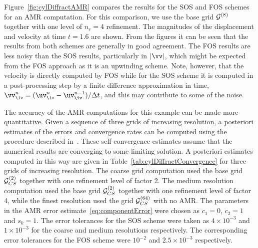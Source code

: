 
Figure~\ref{fig:cylDiffractAMR} compares the results for the SOS and FOS schemes for an AMR computation.
For this comparison, we use the base grid ${\mathcal G}^{(8)}$ together with one
level of $n_r=4$ refinement.  The magnitudes of the displacement
and velocity at time $t=1.6$ are shown. 
From the figures it can be seen that the results from both schemes are generally
in good agreement. The FOS results are less noisy than the SOS results, particularly
in $\vert \vv \vert$, 
which might be expected from the FOS approach as it is an upwinding scheme. 
Note, however, that the velocity is directly computed
by FOS while for the SOS scheme it is computed in a post-processing step
by a finite difference approximation in time, 
$\vv_\iv^n = (\uv_\iv^{n}-\uv_\iv^{n-1})/\dt$, and this may contribute to some of the noise.  




The accuracy of the AMR computations for this example can be made more quantitative.
Given a sequence of three grids of increasing resolution, a posteriori estimates
of the errors and convergence rates can be computed using the procedure
described in~\cite{pog2008a}. These self-convergence estimates assume that the
numerical results are converging to some limiting solution.
A posteriori estimates computed in this way are given in
Table~\ref{tab:cylDiffractConvergence} for three grids of increasing resolution.
The coarse grid computation used the base grid ${\mathcal G}_{CS}^{(2)}$ together with one refinement level of factor 2.
The medium resolution computation used the base grid ${\mathcal G}_{CS}^{(2)}$ together with one refinement level of factor 4,
while the finest resolution used the grid ${\mathcal G}_{CS}^{(64)}$ with no AMR. 
The parameters in the AMR error
estimate~\eqref{eq:componentError} were chosen as $c_1=0$, $c_2=1$ and
$s_k=1$.  The error tolerances for the SOS scheme were taken as $4\times
10^{-3}$ and $1\times 10^{-3}$ for the coarse and medium resolutions
respectively. The corresponding error tolerances for the FOS scheme were
$10^{-2}$ and $2.5\times 10^{-3}$ respectively.

